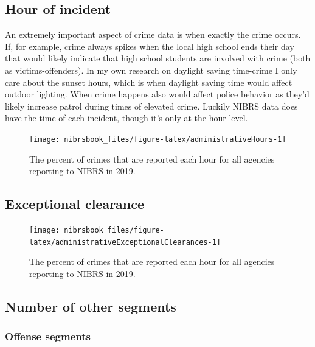 \documentclass[
  12pt,
  openany]{book}
\begin{document}
\hypertarget{hour-of-incident}{%
\subsection{Hour of incident}\label{hour-of-incident}}

An extremely important aspect of crime data is when exactly the crime occurs. If, for example, crime always spikes when the local high school ends their day that would likely indicate that high school students are involved with crime (both as victims-offenders). In my own research on daylight saving time-crime I only care about the sunset hours, which is when daylight saving time would affect outdoor lighting. When crime happens also would affect police behavior as they'd likely increase patrol during times of elevated crime. Luckily NIBRS data does have the time of each incident, though it's only at the hour level.

\begin{figure}

{\centering \texttt{[image: nibrsbook\_files/figure-latex/administrativeHours-1]} 

}

\caption{The percent of crimes that are reported each hour for all agencies reporting to NIBRS in 2019.}\label{fig:administrativeHours}
\end{figure}

\hypertarget{exceptional-clearance}{%
\subsection{Exceptional clearance}\label{exceptional-clearance}}

\begin{figure}

{\centering \texttt{[image: nibrsbook\_files/figure-latex/administrativeExceptionalClearances-1]} 

}

\caption{The percent of crimes that are reported each hour for all agencies reporting to NIBRS in 2019.}\label{fig:administrativeExceptionalClearances}
\end{figure}

\hypertarget{number-of-other-segments}{%
\subsection{Number of other segments}\label{number-of-other-segments}}

\hypertarget{offense-segments}{%
\subsubsection{Offense segments}\label{offense-segments}}
\end{document}
